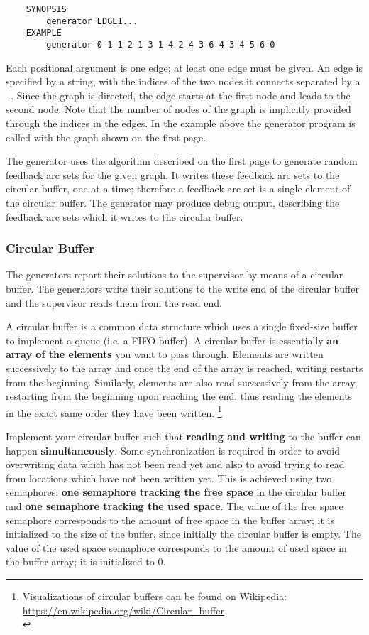 \begin{verbatim}
    SYNOPSIS
        generator EDGE1...
    EXAMPLE
        generator 0-1 1-2 1-3 1-4 2-4 3-6 4-3 4-5 6-0
\end{verbatim}

Each positional argument is one edge; at least one edge must be given.
An edge is specified by a string,
with the indices of the two nodes it connects separated by a \texttt{-}.
Since the graph is directed,
the edge starts at the first node and leads to the second node.
Note that the number of nodes of the graph is implicitly provided
through the indices in the edges.
In the example above the generator program is called with the graph shown on the first page.

The generator uses the algorithm described on the first page
to generate random feedback arc sets for the given graph.
It writes these feedback arc sets to the circular buffer, one at a time;
therefore a feedback arc set is a single element of the circular buffer.
The generator may produce debug output,
describing the feedback arc sets which it writes to the circular buffer.

\clearpage
\subsubsection*{Circular Buffer}

The generators report their solutions to the supervisor by means of a circular buffer.
The generators write their solutions to the write end of the circular buffer
and the supervisor reads them from the read end.

A circular buffer is a common data structure which uses a single fixed-size buffer
to implement a queue (i.e. a FIFO buffer).
A circular buffer is essentially \textbf{an array of the elements} you want to pass through.
Elements are written successively to the array
and once the end of the array is reached, writing restarts from the beginning.
Similarly, elements are also read successively from the array,
restarting from the beginning upon reaching the end,
thus reading the elements in the exact same order they have been written.
\footnote{
Visualizations of circular buffers can be found on Wikipedia:\\
\url{https://en.wikipedia.org/wiki/Circular_buffer}\\
}

Implement your circular buffer such that \textbf{reading and writing} to the buffer
can happen \textbf{simultaneously}.
Some synchronization is required
in order to avoid overwriting data which has not been read yet
and also to avoid trying to read from locations which have not been written yet.
This is achieved using two semaphores:
\textbf{one semaphore tracking the free space} in the circular buffer
and \textbf{one semaphore tracking the used space}.
The value of the free space semaphore corresponds to the amount of free space in the buffer array;
it is initialized to the size of the buffer, since initially the circular buffer is empty.
The value of the used space semaphore corresponds to the amount of used space in the buffer array;
it is initialized to 0.

